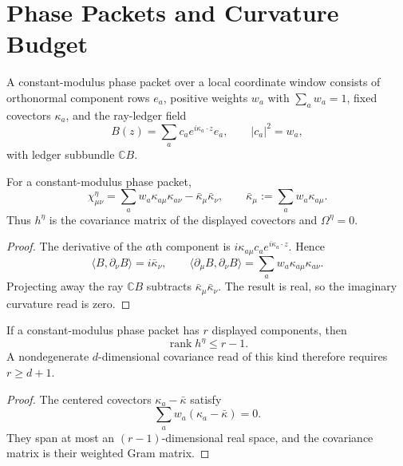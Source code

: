 \section{Phase Packets and Curvature Budget}
\label{sec:innovation-input-phase-packets-curvature-budget}

\begin{definition}
\label{def:innovation-input-constant-modulus-phase-packet}
A constant-modulus phase packet over a local coordinate window consists of
orthonormal component rows $e_a$, positive weights $w_a$ with
$\sum_a w_a=1$, fixed covectors $\kappa_a$, and the ray-ledger field
$$
B(z)=\sum_a c_a e^{i\kappa_a\cdot z}e_a,
\qquad
|c_a|^2=w_a,
$$
with ledger subbundle $\mathbb C B$.
\end{definition}

\begin{theorem}
\label{thm:innovation-input-constant-modulus-covariance}
For a constant-modulus phase packet,
$$
\chi^\eta_{\mu\nu}
=
\sum_a w_a\kappa_{a\mu}\kappa_{a\nu}
-
\bar\kappa_\mu\bar\kappa_\nu,
\qquad
\bar\kappa_\mu:=\sum_a w_a\kappa_{a\mu}.
$$
Thus $h^\eta$ is the covariance matrix of the displayed covectors and
$\Omega^\eta=0$.
\end{theorem}

\begin{proof}
The derivative of the $a$th component is
$i\kappa_{a\mu}c_ae^{i\kappa_a\cdot z}$. Hence
$$
\langle B,\partial_\nu B\rangle=i\bar\kappa_\nu,
\qquad
\langle\partial_\mu B,\partial_\nu B\rangle
=
\sum_a w_a\kappa_{a\mu}\kappa_{a\nu}.
$$
Projecting away the ray $\mathbb C B$ subtracts
$\bar\kappa_\mu\bar\kappa_\nu$. The result is real, so the imaginary
curvature read is zero.
\end{proof}

\begin{corollary}
\label{cor:innovation-input-constant-modulus-rank-budget}
If a constant-modulus phase packet has $r$ displayed components, then
$$
\operatorname{rank}h^\eta\le r-1.
$$
A nondegenerate $d$-dimensional covariance read of this kind therefore
requires $r\ge d+1$.
\end{corollary}

\begin{proof}
The centered covectors $\kappa_a-\bar\kappa$ satisfy
$$
\sum_a w_a(\kappa_a-\bar\kappa)=0.
$$
They span at most an $(r-1)$-dimensional real space, and the covariance
matrix is their weighted Gram matrix.
\end{proof}


